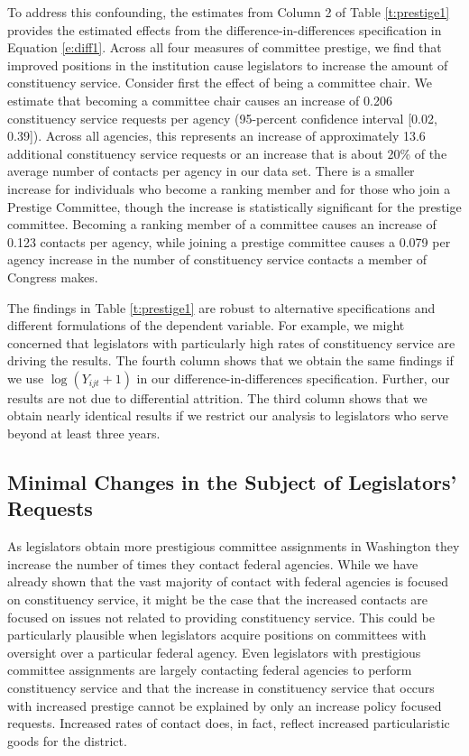 \documentclass[12pt]{article}
\begin{document}
To address this confounding, the estimates from Column 2 of Table \ref{t:prestige1} provides the estimated effects from the difference-in-differences specification in Equation \ref{e:diff1}. Across all four measures of committee prestige, we find that improved positions in the institution cause legislators to increase the amount of constituency service. Consider first the effect of being a committee chair. We estimate that becoming a committee chair causes an increase of 0.206 constituency service requests per agency (95-percent confidence interval [0.02, 0.39]). Across all agencies, this represents an increase of approximately 13.6 additional constituency service requests or an increase that is about 20\% of the average number of contacts per agency in our data set. There is a smaller increase for individuals who become a ranking member and for those who join a Prestige Committee, though the increase is statistically significant for the prestige committee. Becoming a ranking member of a committee causes an increase of 0.123 contacts per agency, while joining a prestige committee causes a 0.079 per agency increase in the number of constituency service contacts a member of Congress makes.

The findings in Table \ref{t:prestige1} are robust to alternative specifications and different formulations of the dependent variable. For example, we might concerned that legislators with particularly high rates of constituency service are driving the results. The fourth column shows that we obtain the same findings if we use $\log (Y_{ijt} + 1)$ in our difference-in-differences specification. Further, our results are not due to differential attrition. The third column shows that we obtain nearly identical results if we restrict our analysis to legislators who serve beyond at least three years.    


\subsection{Minimal Changes in the Subject of Legislators' Requests}
As legislators obtain more prestigious committee assignments in Washington they increase the number of times they contact federal agencies. While we have already shown that the vast majority of contact with federal agencies is focused on constituency service, it might be the case that the increased contacts are focused on issues not related to providing constituency service. This could be particularly plausible when legislators acquire positions on committees with oversight over a particular federal agency. Even legislators with prestigious committee assignments are largely contacting federal agencies to perform constituency service and that the increase in constituency service that occurs with increased prestige cannot be explained by only an increase policy focused requests. Increased rates of contact does, in fact, reflect increased particularistic goods for the district.  
\end{document}
